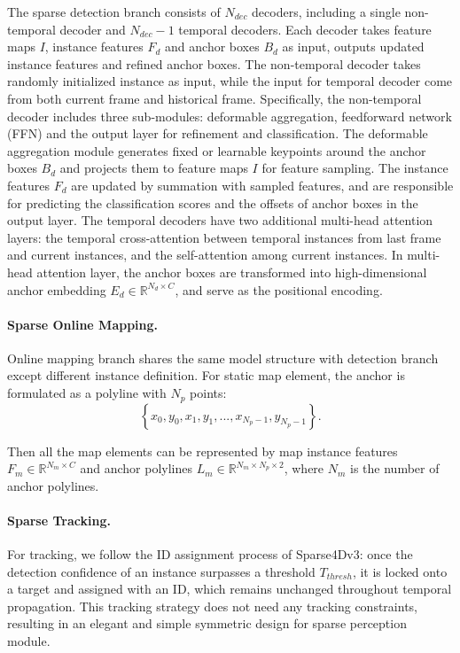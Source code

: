 The sparse detection branch consists of $N_{dec}$ decoders, including a single non-temporal decoder and $N_{dec}-1$ temporal decoders. Each decoder takes feature maps $I$, instance features $F_d$ and anchor boxes $B_d$ as input, outputs updated instance features and refined anchor boxes. The non-temporal decoder takes randomly initialized instance as input, while the input for temporal decoder come from both current frame and historical frame. Specifically, the non-temporal decoder includes three sub-modules: deformable aggregation, feedforward network (FFN) and the output layer for refinement and classification. The deformable aggregation module generates fixed or learnable keypoints around the anchor boxes $B_d$ and projects them to feature maps $I$ for feature sampling. The instance features $F_d$ are updated by summation with sampled features, and are responsible for predicting the classification scores and the offsets of anchor boxes in the output layer. The temporal decoders have two additional multi-head attention layers: the temporal cross-attention between temporal instances from last frame and current instances, and the self-attention among current instances. In multi-head attention layer, the anchor boxes are transformed into high-dimensional anchor embedding $E_d \in \mathbb{R}^{N_d \times C}$, and serve as the positional encoding.



\paragraph{Sparse Online Mapping.}
Online mapping branch shares the same model structure with detection branch except different instance definition. For static map element, the anchor is formulated as a polyline with $N_p$ points: \[ \left\{x_{0},y_{0},x_{1},y_{1},...,x_{N_p-1},y_{N_p-1} \right\}. \] 

Then all the map elements can be represented by map instance features $F_m \in \mathbb{R}^{N_m \times C}$ and anchor polylines $L_m \in \mathbb{R}^{N_m \times N_p \times 2}$, where $N_m$ is the number of anchor polylines.

\paragraph{Sparse Tracking.}
For tracking, we follow the ID assignment process of Sparse4Dv3\cite{sparse4dv3}: once the detection confidence of an instance surpasses a threshold $T_{thresh}$, it is locked onto a target and assigned with an ID, which remains unchanged throughout temporal propagation. This tracking strategy does not need any tracking constraints, resulting in an elegant and simple symmetric design for sparse perception module.

